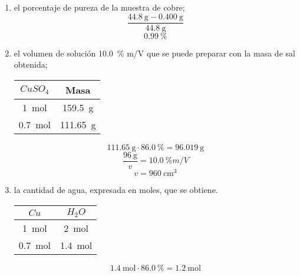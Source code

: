 \documentclass[../practica.root.tex]{subfiles}
\begin{document}
\begin{enumerate}
\begin{enumerate}
\begin{enumerate}[label=\roman*)]
                        \item el porcentaje de pureza de la muestra de cobre;
                              \[ \frac{\SI{44,8}{\g}-\SI{0,400}{\g}}{\SI{44,8}{\g}} \]
                              \[ \boxed{\SI{0,99}{\percent}} \]

                        \item el volumen de solución \SI{10,0}{\percent} m/V que se puede preparar con la masa de sal obtenida;
                              \begin{center}
                                  \begin{tabular}{c|c}
                                      $CuSO_4$        & Masa            \\
                                      \hline
                                      \SI{1}{\mole}   & \SI{159,5}{\g}  \\
                                      \SI{0,7}{\mole} & \SI{111,65}{\g} \\
                                  \end{tabular}
                              \end{center}
                              \[ \SI{111,65}{\g}\cdot\SI{86,0}{\percent} = \SI{96,019}{\g} \]
                              \[ \frac{\SI{96}{\g}}{v} = \SI{10,0}{\percent} m/V \]
                              \[ \boxed{v = \SI{960}{\cm\cubed}} \]

                        \item la cantidad de agua, expresada en moles, que se obtiene.
                              \begin{center}

                                  \begin{tabular}{c|c}
                                      $Cu$            & $H_2O$          \\
                                      \hline
                                      \SI{1}{\mole}   & \SI{2}{\mole}   \\
                                      \SI{0,7}{\mole} & \SI{1,4}{\mole} \\
                                  \end{tabular}
                              \end{center}
                              \[ \SI{1,4}{\mole}\cdot\SI{86,0}{\percent} = \boxed{\SI{1,2}{\mole}} \]
                    \end{enumerate}
          \end{enumerate}


\end{enumerate}
\end{document}
